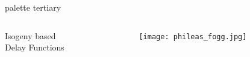 \documentclass[aspectratio=169]{beamer}
\begin{document}

\begin{frame}[plain]
  \begin{beamercolorbox}[sep=0.1px,center,wd=\paperwidth,ht=\paperheight]{palette tertiary}
    \begin{columns}
      \begin{column}{0.64\textwidth}
        \Huge\centering Isogeny based\\Delay Functions
      \end{column}
      \begin{column}{0.36\textwidth}
        \texttt{[image: phileas\_fogg.jpg]}
      \end{column}
    \end{columns}
  \end{beamercolorbox}
\end{frame}

\end{document}
